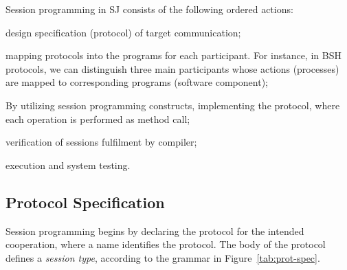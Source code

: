 \documentclass{llncs}
\begin{document}
Session programming in SJ consists of the following ordered actions:

\begin{compactenum}
  \item design specification (protocol) of target communication;
  \item mapping protocols into the programs for each participant. For instance, in BSH protocols, we can distinguish three main participants whose actions (processes) are mapped to corresponding programs (software component);
  \item By utilizing session programming constructs, implementing the protocol, where each operation is performed as method call;
  \item verification of sessions fulfilment by  compiler;
  \item execution and system testing.
\end{compactenum}

\subsection{Protocol Specification}
Session programming begins by declaring the protocol for the intended cooperation, where a name identifies the protocol.
The body of the protocol defines a \textit{session type}, according to the grammar in Figure~\ref{tab:prot-spec}.
\end{document}
